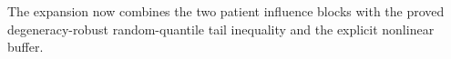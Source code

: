 The expansion now combines the two patient influence blocks with the proved degeneracy-robust random-quantile tail inequality and the explicit nonlinear buffer.